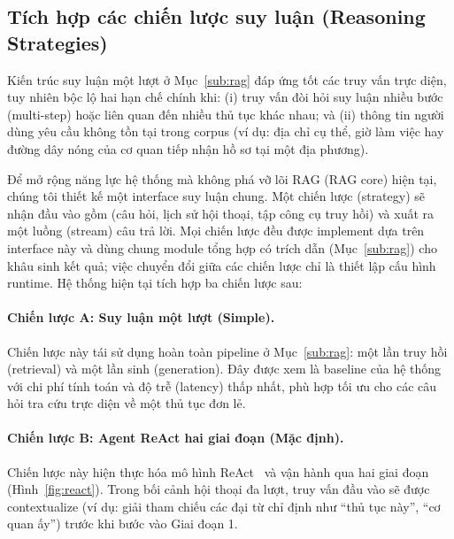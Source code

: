 \documentclass[11pt]{article}
\begin{document}
%                          
\subsection{Tích hợp các chiến lược suy luận (Reasoning Strategies)}
\label{sub:reasoning}

Kiến trúc suy luận một lượt ở Mục~\ref{sub:rag} đáp ứng tốt các truy vấn trực diện, tuy nhiên bộc lộ hai hạn chế chính khi: (i) truy vấn đòi hỏi suy luận nhiều bước (multi-step) hoặc liên quan đến nhiều thủ tục khác nhau; và (ii) thông tin người dùng yêu cầu không tồn tại trong corpus (ví dụ: địa chỉ cụ thể, giờ làm việc hay đường dây nóng của cơ quan tiếp nhận hồ sơ tại một địa phương). 

Để mở rộng năng lực hệ thống mà không phá vỡ lõi RAG (RAG core) hiện tại, chúng tôi thiết kế một interface suy luận chung. Một chiến lược (strategy) sẽ nhận đầu vào gồm (câu hỏi, lịch sử hội thoại, tập công cụ truy hồi) và xuất ra một luồng (stream) câu trả lời. Mọi chiến lược đều được implement dựa trên interface này và dùng chung module tổng hợp có trích dẫn (Mục~\ref{sub:rag}) cho khâu sinh kết quả; việc chuyển đổi giữa các chiến lược chỉ là thiết lập cấu hình runtime. Hệ thống hiện tại tích hợp ba chiến lược sau:

\paragraph{Chiến lược A: Suy luận một lượt (Simple).}
Chiến lược này tái sử dụng hoàn toàn pipeline ở Mục~\ref{sub:rag}: một lần truy hồi (retrieval) và một lần sinh (generation). Đây được xem là baseline của hệ thống với chi phí tính toán và độ trễ (latency) thấp nhất, phù hợp tối ưu cho các câu hỏi tra cứu trực diện về một thủ tục đơn lẻ.

\paragraph{Chiến lược B: Agent ReAct hai giai đoạn (Mặc định).}
Chiến lược này hiện thực hóa mô hình ReAct~\citep{yao2023react} và vận hành qua hai giai đoạn (Hình~\ref{fig:react}). Trong bối cảnh hội thoại đa lượt, truy vấn đầu vào sẽ được contextualize (ví dụ: giải tham chiếu các đại từ chỉ định như ``thủ tục này'', ``cơ quan ấy'') trước khi bước vào Giai đoạn 1.
\end{document}
